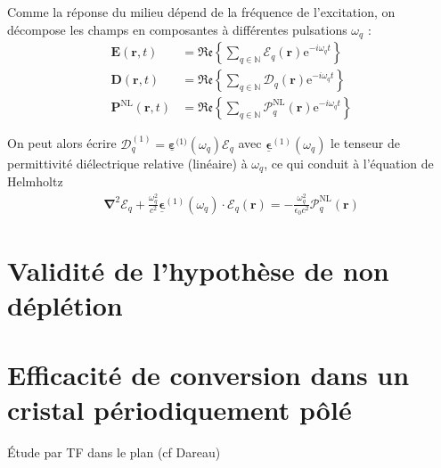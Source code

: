 \documentclass[11pt,a4paper] { article}
\newcommand{\E}{\mathcal{E}}
\newcommand{\e}[1]{\text{e}^{#1}}
\newcommand{\mathsc}[1]{\mathrm{\scriptscriptstyle {#1}}}
\renewcommand{\v}[1]{\boldsymbol{\mathbf{#1}}}
\newcommand{\tens}[1]{\boldsymbol{\underline{#1}}}
\begin{document}
Comme la réponse du milieu dépend de la fréquence de l'excitation, on décompose les champs en composantes à différentes pulsations $\omega_q$ :
\begin{align*}
	\v E(\v r, t) &= \mathfrak{Re} \left\{ \sum_{q \in \mathbb N} \v {\boldsymbol{\mathcal E}}_q (\v r) \e{-i \omega_q t} \right\} \\
	\v D(\v r, t) &= \mathfrak{Re} \left\{ \sum_{q \in \mathbb N} \v {\boldsymbol{\mathcal D}}_q (\v r) \e{-i \omega_q t} \right\} \\
	\v P^\mathsc{NL}(\v r, t) &= \mathfrak{Re} \left\{ \sum_{q \in \mathbb N} \v {\boldsymbol{\mathcal P}}^\mathsc{NL}_q (\v r) \e{-i \omega_q t} \right\}
\end{align*}

On peut alors écrire $\v {\boldsymbol{\mathcal D}}^\mathsc{(1)}_q = \tens \varepsilon^{\mathsc(1)}(\omega_q) \v {\boldsymbol{\mathcal E}}_q$ avec $\tens \epsilon^{(1)}(\omega_q)$ le tenseur de permittivité diélectrique relative (linéaire) à $\omega_q$, ce qui conduit à l'équation de Helmholtz  \citep{boyd}
\begin{align*}
	\boldsymbol{\nabla}^2 \boldsymbol{\E}_q + \frac{\omega_q^2}{c^2}\tens\epsilon^{(1)}(\omega_q)\cdot \v \E_q(\v r) = - \frac{\omega_q^2}{\epsilon_0 c^2} \boldsymbol{\mathcal{P}}^\mathsc{NL}_q(\v r)
\end{align*}

\section{Validité de l'hypothèse de non déplétion}
\label{ndepl}

\section{Efficacité de conversion dans un  cristal périodiquement pôlé}
Étude par TF dans le plan (cf Dareau)
\label{BK}




\end{document}

